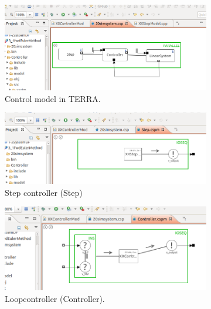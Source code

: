 \documentclass[a4paper,twoside,11pt]{article}
\begin{document}
\begin{figure}
	\centering
	\begin{subfigure}{0.5\textwidth}
	 \centering
	 \includegraphics[width=\textwidth]{./images/3-1_terra_overview.png}
	 \caption{Control model in TERRA.}
	 \label{fig:3_1_terra_overview}
	\end{subfigure}%
	\begin{subfigure}{0.5\textwidth}
	 \centering
	 \includegraphics[width=\textwidth]{./images/3-1_terra_step.png}
	 \caption{Step controller (Step)}
	 \label{fig:3_1_terra_step}
	\end{subfigure}
	\begin{subfigure}{0.5\textwidth}
	 \centering
	 \includegraphics[width=\textwidth]{./images/3-1_terra_controller.png}
	 \caption{Loopcontroller (Controller).}
	 \label{fig:3_1_terra_controller}
	\end{subfigure}%
	\begin{subfigure}{0.5\textwidth}
	 \centering

\end{subfigure}
\end{figure}
\end{document}
